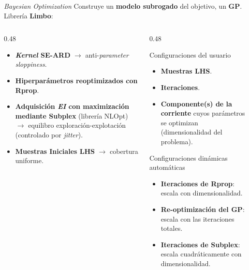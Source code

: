 \documentclass[10pt, aspectratio=169]{beamer}
\begin{document}
\begin{frame}{\textit{Bayesian Optimization}}
    Construye un \textbf{modelo subrogado} del objetivo, un \textbf{GP}. Librería \textbf{Limbo}:
    \begin{columns}[t]
        \begin{column}{0.48\textwidth}
            \begin{itemize}
                \item \textbf{\textit{Kernel} SE-ARD} $\to$ anti-\textit{parameter sloppiness}.
                \item \textbf{Hiperparámetros reoptimizados con Rprop}.
                \item \textbf{Adquisición \textit{EI} con maximización mediante Subplex} (librería NLOpt) $\to$ equilibro exploración-explotación (controlado por \textit{jitter}).
                \item \textbf{Muestras Iniciales LHS} $\to$ cobertura uniforme.
            \end{itemize}
        \end{column}
        \begin{column}{0.48\textwidth}
            \scriptsize
            \begin{block}{Configuraciones del usuario}
                \begin{itemize}
                    \item \textbf{Muestras LHS}.
                    \item \textbf{Iteraciones}.
                    \item \textbf{Componente(s) de la corriente} cuyos parámetros se optimizan (dimensionalidad del problema).
                \end{itemize}
            \end{block}
            \begin{block}{Configuraciones dinámicas automáticas}
                \begin{itemize}
                    \item \textbf{Iteraciones de Rprop}: escala con dimensionalidad.
                    \item \textbf{Re-optimización del GP}: escala con las iteraciones totales.
                    \item \textbf{Iteraciones de Subplex}: escala cuadráticamente con dimensionalidad.
                \end{itemize}
            \end{block}
        \end{column}
    \end{columns}
\end{frame}
\end{document}
